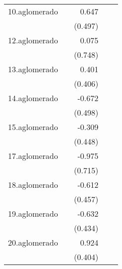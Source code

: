 {\begin{longtable}{l*{4}{D{.}{.}{-1}}}
\addlinespace
10.aglomerado&                     &       0.647         &                     &                     \\
            &                     &     (0.497)         &                     &                     \\
\addlinespace
12.aglomerado&                     &       0.075         &                     &                     \\
            &                     &     (0.748)         &                     &                     \\
\addlinespace
13.aglomerado&                     &       0.401         &                     &                     \\
            &                     &     (0.406)         &                     &                     \\
\addlinespace
14.aglomerado&                     &      -0.672         &                     &                     \\
            &                     &     (0.498)         &                     &                     \\
\addlinespace
15.aglomerado&                     &      -0.309         &                     &                     \\
            &                     &     (0.448)         &                     &                     \\
\addlinespace
17.aglomerado&                     &      -0.975         &                     &                     \\
            &                     &     (0.715)         &                     &                     \\
\addlinespace
18.aglomerado&                     &      -0.612         &                     &                     \\
            &                     &     (0.457)         &                     &                     \\
\addlinespace
19.aglomerado&                     &      -0.632         &                     &                     \\
            &                     &     (0.434)         &                     &                     \\
\addlinespace
20.aglomerado&                     &       0.924\sym{*}  &                     &                     \\
            &                     &     (0.404)         &                     &                     \\

\end{longtable}}
